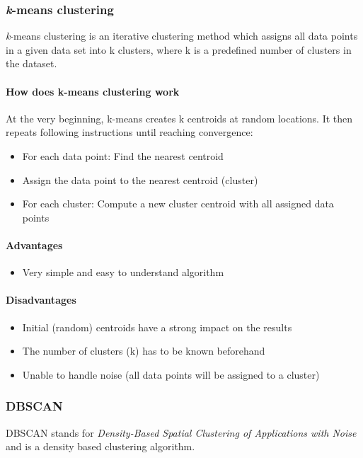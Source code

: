 
\subsubsection{\textit{k}-means clustering}
\textit{k}-means clustering is an iterative clustering method which assigns all data points in a given data set
into k clusters, where k is a predefined number of clusters in the dataset.

\paragraph{How does k-means clustering work}
At the very beginning, k-means creates k centroids at random locations.
It then repeats following instructions until reaching convergence:

\begin{itemize}
    \item For each data point: Find the nearest centroid
    \item Assign the data point to the nearest centroid (cluster)
    \item For each cluster: Compute a new cluster centroid with all assigned data points
\end{itemize}

\paragraph{Advantages}
\begin{itemize}
    \item Very simple and easy to understand algorithm
\end{itemize}

\paragraph{Disadvantages}
\begin{itemize}
    \item Initial (random) centroids have a strong impact on the results
    \item The number of clusters (k) has to be known beforehand
    \item Unable to handle noise (all data points will be assigned to a cluster)
\end{itemize}

\subsubsection{DBSCAN}
DBSCAN stands for \textit{Density-Based Spatial Clustering of Applications with Noise}
and is a density based clustering algorithm.

